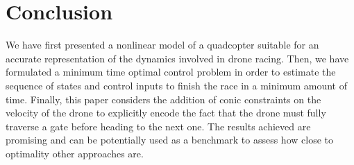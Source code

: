 
\section{Conclusion}
\label{sec:conclusions}

We have first presented a nonlinear model of a quadcopter suitable for an accurate representation of the dynamics involved in drone racing.
Then, we have formulated a minimum time optimal control problem in order to estimate the sequence of states and control inputs to finish the race in a minimum amount of time.
Finally, this paper considers the addition of conic constraints on the velocity of the drone to explicitly encode the fact that the drone must fully traverse a gate before heading to the next one.
The results achieved are promising and can be potentially used as a benchmark to assess how close to optimality other approaches are.